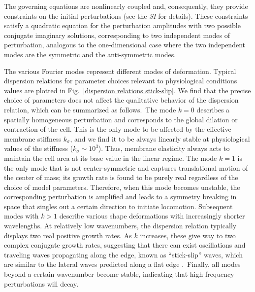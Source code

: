 \documentclass[12pt]{article}
\begin{document}
        The governing equations are nonlinearly coupled and, consequently, they provide constraints on the initial perturbations (see the \textit{SI} for details).
        These constraints satisfy a quadratic equation for the perturbation amplitudes with two possible conjugate imaginary solutions, corresponding to two independent modes of perturbation, analogous to the one-dimensional case \cite{sens2020stick} where the two independent modes are the symmetric and the anti-symmetric modes. 
        
        The various Fourier modes represent different modes of deformation. Typical dispersion relations for parameter choices relevant to physiological conditions values are plotted in Fig.~\ref{dispersion relations stick-slip}. 
        We find that the precise choice of parameters does not affect the qualitative behavior of the dispersion relation, which can be summarized as follows.\ 
        The mode $k=0$ describes a spatially homogeneous perturbation and corresponds to the global 
        dilation or contraction of the cell. 
        This is the only mode to be affected by the effective membrane stiffness $k_\sigma$, and we find it to be always linearly stable at physiological values of the stiffness ($k_\sigma \sim 10^3$). 
        Thus, membrane elasticity always acts to maintain the cell area at its base value in the linear regime. 
        The mode $k=1$ is the only mode that is not center-symmetric and captures translational motion of the center of mass; its growth rate is found to be purely real regardless of the choice of model parameters. 
        Therefore, when this mode becomes unstable, the corresponding perturbation is amplified and leads to a symmetry breaking in space that singles out a certain direction to initiate locomotion. 
        Subsequent modes with $k>1$ describe various shape deformations with increasingly shorter wavelengths. At relatively low wavenumbers, the dispersion relation typically displays two real positive growth rates. As $k$ increases, these give way to two complex conjugate growth rates, suggesting that there can exist oscillations and traveling waves propagating along the edge, known as ``stick-slip'' waves, which are similar to the lateral waves predicted along a flat edge \cite{sens2020stick}.\ Finally, all modes beyond a certain wavenumber become stable, indicating that high-frequency perturbations will decay.
\end{document}
